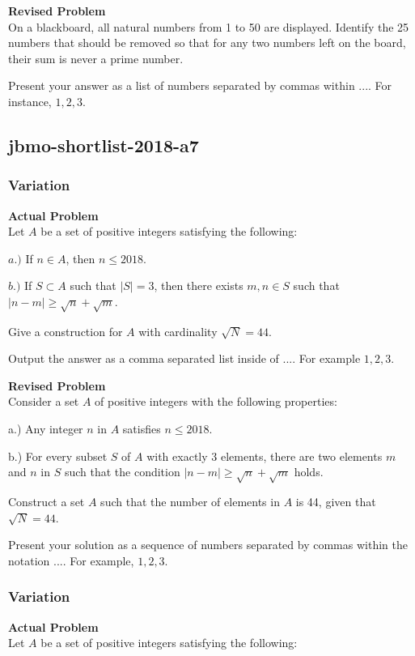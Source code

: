 \textbf{Revised Problem}\\
On a blackboard, all natural numbers from 1 to 50 are displayed. Identify the 25 numbers that should be removed so that for any two numbers left on the board, their sum is never a prime number.

Present your answer as a list of numbers separated by commas within $\boxed{...}$. For instance, $\boxed{1, 2, 3}$.

\subsection{jbmo-shortlist-2018-a7}
\subsubsection{Variation}
\textbf{Actual Problem}\\
Let $A$ be a set of positive integers satisfying the following:

$a.)$ If $n \in A$, then $n \le 2018$.

$b.)$ If $S \subset A$ such that $|S|=3$, then there exists $m,n \in S$ such that $|n-m| \ge \sqrt{n}+\sqrt{m}$.

Give a construction for $A$ with cardinality $\sqrt{N}=44$.

Output the answer as a comma separated list inside of $\boxed{...}$. For example $\boxed{1, 2, 3}$.

\textbf{Revised Problem}\\
Consider a set \( A \) of positive integers with the following properties:

a.) Any integer \( n \) in \( A \) satisfies \( n \leq 2018 \).

b.) For every subset \( S \) of \( A \) with exactly 3 elements, there are two elements \( m \) and \( n \) in \( S \) such that the condition \( |n - m| \geq \sqrt{n} + \sqrt{m} \) holds.

Construct a set \( A \) such that the number of elements in \( A \) is 44, given that \( \sqrt{N} = 44 \).

Present your solution as a sequence of numbers separated by commas within the notation \(\boxed{...}\). For example, \(\boxed{1, 2, 3}\).

\subsubsection{Variation}
\textbf{Actual Problem}\\
Let $A$ be a set of positive integers satisfying the following:

